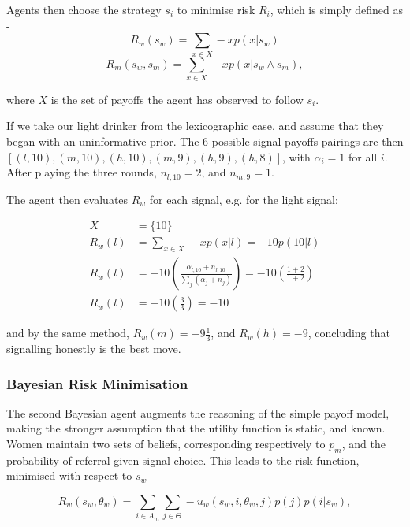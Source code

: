 Agents then choose the strategy $s_{i}$ to minimise risk $R_{i}$, which is simply defined as - 
\begin{equation}
R_{w}(s_{w}) = \sum_{x \in X} -xp(x | s_{w})
\end{equation}
\begin{equation}
R_{m}(s_{w}, s_{m}) = \sum_{x \in X} -xp(x | s_{w}\wedge s_{m}),
\end{equation}

where $X$ is the set of payoffs the agent has observed to follow $s_{i}$.


If we take our light drinker from the lexicographic case, and assume that they began with an uninformative prior. The 6 possible signal-payoffs pairings are then \([(l,10),(m,10),(h,10),(m,9),(h,9),(h,8)]\), with \(\alpha_{i}=1\) for all \(i\). After playing the three rounds, \(n_{l,10}=2\), and \(n_{m,9}=1\).

The agent then evaluates \(R_{w}\) for each signal, e.g. for the light signal:

\begin{equation*}
\begin{align*}
X &= \{10\}\\
R_{w}(l) &= \sum_{x \in X} -xp(x | l) = -10p(10 | l)\\
R_{w}(l) &= -10(\frac{\alpha_{l,10}+n_{l,10}}{\sum_{j}(\alpha_{j}+n_{j})}) = -10(\frac{1+2}{1+2})\\
R_{w}(l) &= -10(\frac{3}{3}) = -10
\end{align*}
\end{equation*}

and by the same method, \(R_{w}(m)=-9\frac{1}{3}\), and \(R_{w}(h)=-9\), concluding that signalling honestly is the best move.

\subsubsection{Bayesian Risk Minimisation}

The second Bayesian agent augments the reasoning of the simple payoff model, making the stronger assumption that the utility function is static, and known. Women maintain two sets of beliefs, corresponding respectively to \(p_{m}\), and the probability of referral given signal choice. This leads to the risk function, minimised with respect to \(s_{w}\) -

\begin{equation}
R_{w}(s_{w}, \theta_{w}) = \sum_{i\in A_{m}}\sum_{j\in \Theta} -u_{w}(s_{w}, i, \theta_{w}, j)p(j)p(i | s_{w}),
\end{equation}

